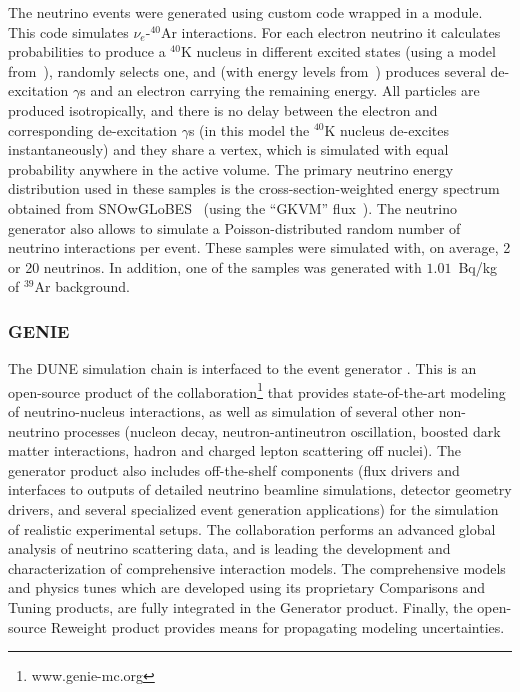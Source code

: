 The  neutrino events were generated using custom code wrapped in a  module.
This code simulates  $\nu_e$-$^{40}$Ar interactions.
For each electron neutrino it calculates probabilities to produce a $^{40}$K nucleus
in different excited states (using a model from~\cite{Bhattacharya:1998hc}),
randomly selects one, and (with energy levels from~\cite{Cameron:2004myb}) 
produces several de-excitation $\gamma$s and an electron carrying the remaining energy.
All particles are produced isotropically, and 
there is no delay between the electron and corresponding de-excitation $\gamma$s
(in this model the $^{40}$K nucleus de-excites instantaneously) and they share a vertex,
which is simulated with equal probability anywhere in the active volume.
The primary neutrino energy distribution used in these samples is the cross-section-weighted 
energy spectrum obtained from SNOwGLoBES~\cite{snowglobes} (using the ``GKVM'' flux~\cite{GKVM}).
The  neutrino generator also allows to simulate a Poisson-distributed random number 
of neutrino interactions per event. These samples were simulated with, on average, 2 or 20 neutrinos.
In addition, one of the samples was generated with $1.01$~Bq/kg of $^{39}$Ar background.

\subsubsection{GENIE}

The DUNE  simulation chain is interfaced to the  event generator \cite{Andreopoulos:2009rq}. This is an open-source product of the  collaboration\footnote{www.genie-mc.org}  that provides state-of-the-art modeling of neutrino-nucleus interactions, as well as simulation of several other non-neutrino processes (nucleon decay, neutron-antineutron oscillation, boosted dark matter interactions, hadron and charged lepton scattering off nuclei). The generator product also includes off-the-shelf components (flux drivers and interfaces to outputs of detailed neutrino beamline simulations, detector geometry drivers, and several specialized event generation applications) for the simulation of realistic experimental setups. The  collaboration performs an advanced global analysis of neutrino scattering data, and is leading the development and characterization of comprehensive interaction models. The  comprehensive models and physics tunes which are developed using its proprietary Comparisons and Tuning products, are fully integrated in the  Generator product. Finally, the open-source  Reweight product provides means for propagating modeling uncertainties. 

